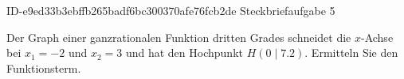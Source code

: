\begin{exercise}
      {ID-e9ed33b3ebffb265badf6bc300370afe76fcb2de}
      {Steckbriefaufgabe 5}
  \ifproblem\problem\par
    Der Graph einer ganzrationalen Funktion dritten Grades schneidet
    die $x$-Achse bei $x_1=\num{-2}$ und $x_2=\num{3}$ und hat den
    Hochpunkt $H(\num{0}\mid\num{7.2})$. Ermitteln Sie den
    Funktionsterm.
  \fi
\end{exercise}
